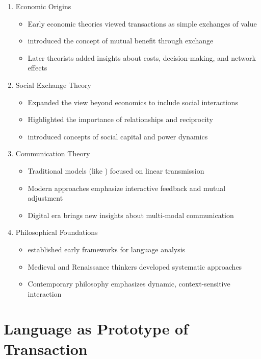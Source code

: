 \documentclass[12pt]{article}
\begin{document}
\begin{enumerate}
\item Economic Origins
\begin{itemize}
\item Early economic theories viewed transactions as simple exchanges of value
\item \citet{smith1776wealth} introduced the concept of mutual benefit through exchange
\item Later theorists added insights about costs, decision-making, and network effects
\end{itemize}

\item Social Exchange Theory
\begin{itemize}
\item Expanded the view beyond economics to include social interactions
\item Highlighted the importance of relationships and reciprocity
\item \citet{blau1964exchange} introduced concepts of social capital and power dynamics
\end{itemize}

\item Communication Theory
\begin{itemize}
\item Traditional models (like \citet{shannon1948mathematical}) focused on linear transmission
\item Modern approaches emphasize interactive feedback and mutual adjustment
\item Digital era brings new insights about multi-modal communication
\end{itemize}

\item Philosophical Foundations
\begin{itemize}
\item \citet{wittgenstein1922tractatus} established early frameworks for language analysis
\item Medieval and Renaissance thinkers developed systematic approaches
\item Contemporary philosophy emphasizes dynamic, context-sensitive interaction
\end{itemize}
\end{enumerate}

\section{Language as Prototype of Transaction}
\end{document}
